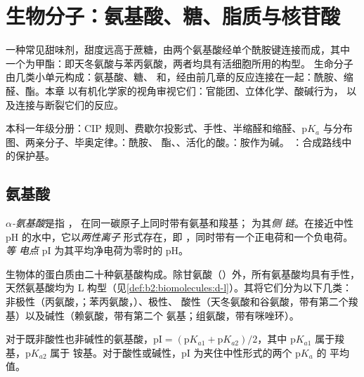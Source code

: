 \chapter{生物分子：氨基酸、糖、脂质与核苷酸}\label{ch:b2:biomolecules}

一种常见甜味剂，甜度远高于蔗糖，由两个氨基酸经单个酰胺键连接而成，其中
一个为甲酯：即天冬氨酸与苯丙氨酸，两者均具有活细胞所用的构型。
生命分子由几类小单元构成：氨基酸、糖、
和，经由前几章的反应连接在一起：酰胺、缩醛、酯。本章
以有机化学家的视角审视它们：官能团、立体化学、酸碱行为，
以及连接与断裂它们的反应。

\begin{recall}
本科一年级分册：CIP 规则、费歇尔投影式、手性、半缩醛和缩醛、$\mathrm pK_a$
与分布图、两亲分子、毕奥定律。：酰胺、
酯、、活化的酸。：胺作为碱。
：合成路线中的保护基。
\end{recall}

\section{氨基酸}

\begin{definition}[氨基酸]\label{def:b2:biomolecules:amino-acid}
\emph{$\alpha$-氨基酸}是指 ，
在同一碳原子上同时带有氨基和羧基； 为其\emph{侧
链}。在接近中性 pH 的水中，它以\emph{两性离子}
形式存在，即 ，同时带有一个正电荷和一个负电荷。\emph{等
电点} pI 为其平均净电荷为零时的 pH。
\end{definition}

生物体的蛋白质由二十种氨基酸构成。除甘氨酸（）外，所有氨基酸均具有手性，
天然氨基酸均为 L 构型（见\cref{def:b2:biomolecules:d-l}）。其将它们分为以下几类：
非极性（丙氨酸，；苯丙氨酸，）、极性、
酸性（天冬氨酸和谷氨酸，带有第二个羧基）以及碱性（赖氨酸，带有第二个
氨基；组氨酸，带有咪唑环）。

\begin{proposition}[等电点]\label{prop:b2:biomolecules:pi}
对于既非酸性也非碱性的氨基酸，$\mathrm{pI} = (\mathrm pK_{a1} +
\mathrm pK_{a2})/2$，其中 $\mathrm pK_{a1}$ 属于羧基，$\mathrm pK_{a2}$ 属于
铵基。对于酸性或碱性，pI 为夹住中性形式的两个 $\mathrm pK_a$ 的
平均值。
\end{proposition}

